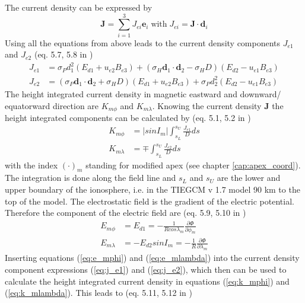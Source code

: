 %
The current density can be expressed by
%
\begin{equation}
   \mathbf{J} = \sum_{i=1}^3 {J}_{ei} \mathbf{e}_i  \; \text{with} \;
   {J}_{ei} = \mathbf{J} \cdot \mathbf{d}_i
\end{equation}
%
Using all the equations from above leads to the current density components ${J}_{e1}$
and ${J}_{e2}$ (eq. 5.7, 5.8 in \cite{rich95})  
%
\begin{align}
   {J}_{e1} &= \sigma_P d_1^2 ( E_{d1} + u_{e2} B_{e3}) + 
     (\sigma_H \mathbf{d}_1 \cdot \mathbf{d}_2 - \sigma_H D) 
     ( E_{d2} - u_{e1} B_{e3}) \label{eq:j_e1} \\
   {J}_{e2} &= (\sigma_P \mathbf{d}_1 \cdot \mathbf{d}_2 + \sigma_H D) 
     ( E_{d1} + u_{e2} B_{e3}) + 
     \sigma_P {d}_2^2 ( E_{d2} - u_{e1} B_{e3})  \label{eq:j_e2}
\end{align}
%
The height integrated current density in magnetic eastward and downward/
equatorward direction are $K_{m \phi}$ and $K_{m \lambda}$. Knowing the current
density $\mathbf{J}$ the height integrated components can be calculated by 
(eq. 5.1, 5.2 in \cite{rich95})  
% 
\begin{align}
   K_{m \phi}  &= |sin I_m | \int_{s_L}^{s_U} \frac{J_{e1}}{D}
   		     ds \label{eq:k_mphi} \\
   K_{m \lambda} &= \mp \int_{s_L}^{s_U} \frac{J_{e2}}{D} ds \label{eq:k_mlambda}
\end{align}
%
with the index $(\cdot)_m$ standing for modified apex (see chapter 
\ref{cap:apex_coord}).
The integration is done along the field line and $s_L$ and $s_U$ are the lower and 
upper
boundary of the ionosphere, i.e. in the TIEGCM v 1.7 model 90 km to the top of 
the model. The electrostatic  field is  the gradient of the electric potential.
Therefore the component of the electric field are (eq. 5.9, 5.10 in \cite{rich95})  
% 
\begin{align}
E_{m \phi} &= E_{d1} = - \frac{1}{R cos \lambda_m} 
                      \frac{\partial \Phi}{\partial \phi_m} \label{eq:e_mphi} \\
E_{m \lambda} &= - E_{d2} sin I_m= - \frac{1}{R} 
                      \frac{\partial \Phi}{\partial \lambda_m}\label{eq:e_mlambda}
\end{align}
%
Inserting equations (\ref{eq:e_mphi}) and (\ref{eq:e_mlambda}) into the current
density component expressions (\ref{eq:j_e1}) and (\ref{eq:j_e2}), which then can be
used to calculate the height integrated current density in equations 
(\ref{eq:k_mphi}) and (\ref{eq:k_mlambda}). This leads to (eq. 5.11, 5.12 in \cite{rich95}) 
